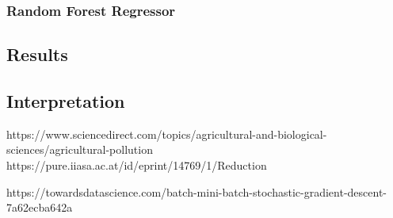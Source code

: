 \subsubsection{Random Forest Regressor}

\subsection{Results}
\subsection{Interpretation}

https://www.sciencedirect.com/topics/agricultural-and-biological-sciences/agricultural-pollution 
https://pure.iiasa.ac.at/id/eprint/14769/1/Reduction%

https://towardsdatascience.com/batch-mini-batch-stochastic-gradient-descent-7a62ecba642a